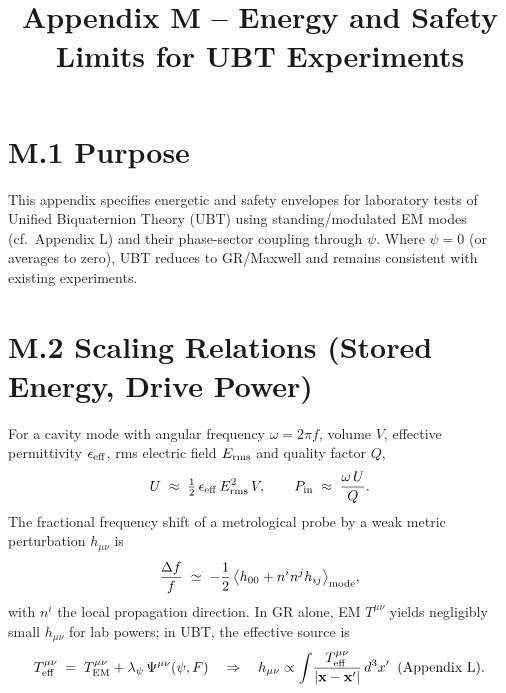 \documentclass[12pt]{article}
\title{Appendix M -- Energy and Safety Limits for UBT Experiments}
\date{}
\begin{document}
\maketitle

\section*{M.1 Purpose}
This appendix specifies energetic and safety envelopes for laboratory tests of Unified Biquaternion Theory (UBT) using standing/modulated EM modes (cf.\ Appendix L) and their phase-sector coupling through $\psi$. Where $\psi\!=\!0$ (or averages to zero), UBT reduces to GR/Maxwell and remains consistent with existing experiments.

\section*{M.2 Scaling Relations (Stored Energy, Drive Power)}
For a cavity mode with angular frequency $\omega=2\pi f$, volume $V$, effective permittivity $\epsilon_{\rm eff}$, rms electric field $E_{\rm rms}$ and quality factor $Q$,
\begin{equation}
U \;\approx\; \tfrac{1}{2}\,\epsilon_{\rm eff}\,E_{\rm rms}^2\,V,\qquad
P_{\rm in} \;\approx\; \frac{\omega\,U}{Q}.
\end{equation}
The fractional frequency shift of a metrological probe by a weak metric perturbation $h_{\mu\nu}$ is
\begin{equation}
\frac{\Delta f}{f}\;\simeq\; -\frac{1}{2}\,\big\langle h_{00}+n^i n^j h_{ij}\big\rangle_{\rm mode},
\end{equation}
with $n^i$ the local propagation direction. In GR alone, EM $T^{\mu\nu}$ yields negligibly small $h_{\mu\nu}$ for lab powers; in UBT, the effective source is
\begin{equation}
T^{\mu\nu}_{\rm eff} \;=\; T^{\mu\nu}_{\rm EM} + \lambda_\psi\,\Psi^{\mu\nu}(\psi,F) \quad\Rightarrow\quad
h_{\mu\nu}\propto \int \! \frac{T^{\mu\nu}_{\rm eff}}{|\mathbf{x}-\mathbf{x}'|}\,d^3x' \;\;(\text{Appendix L}).
\end{equation}
\end{document}
